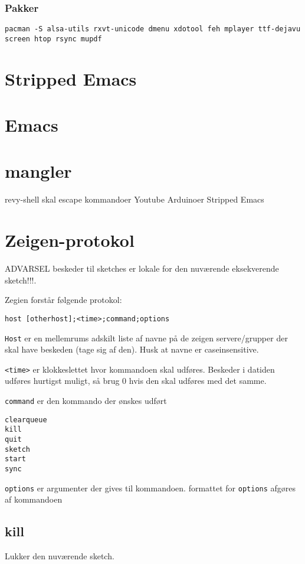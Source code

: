 \documentclass[10pt,a4paper,danish]{article}
\begin{document}
\subsubsection{Pakker}
\begin{verbatim}
pacman -S alsa-utils rxvt-unicode dmenu xdotool feh mplayer ttf-dejavu screen htop rsync mupdf
\end{verbatim}

\section{Stripped Emacs}
\section{Emacs}
\section{mangler}
revy-shell skal escape kommandoer
Youtube
Arduinoer
Stripped Emacs

\section{Zeigen-protokol}

ADVARSEL beskeder til sketches er lokale for den nuværende eksekverende sketch!!!.

Zegien forstår følgende protokol:

\begin{verbatim}
host [otherhost];<time>;command;options
\end{verbatim}

\texttt{Host} er en mellemrums adskilt liste af navne på de zeigen servere/grupper der
skal have beskeden (tage sig af den). Husk at navne er caseinsensitive.

\texttt{<time>} er klokkeslettet hvor kommandoen skal udføres.
Beskeder i datiden udføres hurtigst muligt, så brug 0 hvis den skal udføres med
det samme.

\texttt{command} er den kommando der ønskes udført
\begin{verbatim}
clearqueue
kill
quit
sketch
start
sync
\end{verbatim}

\texttt{options} er argumenter der gives til kommandoen.
formattet for \texttt{options} afgøres af kommandoen

\subsection{kill}
Lukker den nuværende sketch.
\end{document}
